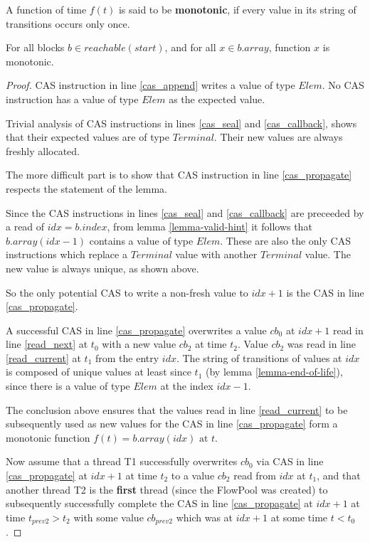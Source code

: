 \documentclass[runningheads,a4paper]{llncs}
\begin{document}
\begin{definition}[Monotonicity]
A function of time $f(t)$ is said to be \textbf{monotonic}, if every value in its string of transitions occurs only once.
\end{definition}


\begin{lemma}[Freshness]\label{lemma-freshness}
For all blocks $b \in reachable(start)$, and for all $x \in b.array$,
function $x$ is monotonic.
\end{lemma}

\begin{proof}
CAS instruction in line \ref{cas_append} writes a value of type
$Elem$. No CAS instruction has a value of type $Elem$ as the expected value.

Trivial analysis of CAS instructions in lines \ref{cas_seal} and
\ref{cas_callback}, shows that their expected values are of type
$Terminal$. Their new values are always freshly allocated.

The more difficult part is to show that CAS instruction in line
\ref{cas_propagate} respects the statement of the lemma.

Since the CAS instructions in lines \ref{cas_seal} and
\ref{cas_callback} are preceeded by a read of $idx = b.index$,
from lemma \ref{lemma-valid-hint} it follows that $b.array(idx - 1)$ 
contains a value of type $Elem$.
These are also the only CAS instructions which replace a $Terminal$
value with another $Terminal$ value. The new value is always unique, as
shown above.

So the only potential CAS to write a non-fresh value to $idx + 1$ is the CAS
in line \ref{cas_propagate}.

A successful CAS in line \ref{cas_propagate} overwrites a value $cb_0$ at $idx + 1$
read in line \ref{read_next} at $t_0$ with a new value $cb_2$ at time $t_2$. Value $cb_2$ was
read in line \ref{read_current} at $t_1$ from the entry $idx$. The
string of transitions of values at $idx$ is composed of unique values
at least since $t_1$ (by lemma \ref{lemma-end-of-life}), since there is
a value of type $Elem$ at the index $idx - 1$.

The conclusion above ensures that the values read in line \ref{read_current}
to be subsequently used as new values for the CAS in line \ref{cas_propagate}
form a monotonic function $f(t) = b.array(idx) \text{ at } t$.

Now assume that a thread T1 successfully overwrites $cb_0$
via CAS in line \ref{cas_propagate} at $idx + 1$ at time $t_2$ 
to a value $cb_2$ read from $idx$ at $t_1$, and that another thread T2 
is the \textbf{first} thread (since the FlowPool was created) to subsequently successfully
complete the CAS in line \ref{cas_propagate} at $idx + 1$ at time
$t_{prev2} > t_2$ with some value $cb_{prev2}$ which was at $idx + 1$ at some time
$t < t_0$.


\end{proof}
\end{document}
